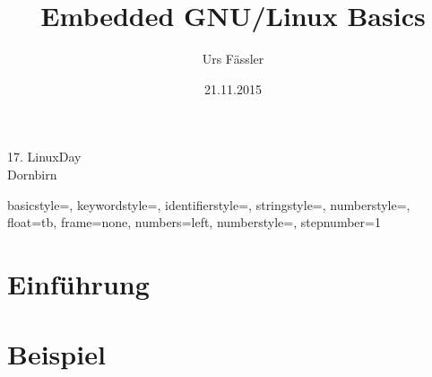 \usepackage[utf8x]{inputenc}
\usepackage{ucs}
\usepackage{amsmath}
\usepackage{amsfonts}
\usepackage{amssymb}
\usepackage{multicol}
\usepackage{graphicx}
\usepackage{tikz}
\usetikzlibrary{arrows,positioning,shapes,graphs}
\usepackage{listings}
\usepackage{multicol}
\usepackage[absolute,overlay]{textpos}
\usepackage{appendixnumberbeamer}
\usepackage{url}

\setlength{\TPHorizModule}{1cm}
\setlength{\TPVertModule}{1cm}

\title{Embedded GNU/Linux Basics}
\author{Urs Fässler}
\date{21.11.2015}
\institute
{
  17. LinuxDay\\
  Dornbirn
}

\newcommand{\hnote}[1]{\only<handout>{\footnote{#1}}}
\newcommand{\hcite}[1]{\only<handout>{\cite{#1}}}

\lstset
{  
	basicstyle=\scriptsize\ttfamily,
	keywordstyle={\bf\color{green!50!black}},
	identifierstyle=\color{blue!25!black},
	stringstyle=\color{orange!75!black},
  numberstyle={\color{Grey}},
	float=tb,
	frame=none,
	numbers=left,                           %
	numberstyle=\tiny,                      %
	stepnumber=1                           %
}


\newcommand*\oldmacro{}%
\let\oldmacro\insertshorttitle%
\renewcommand*\insertshorttitle{%
	\oldmacro\hfill%
	\insertframenumber
}

\beamertemplatenavigationsymbolsempty






\frame{\titlepage}

\section{Einführung}

\section{Beispiel}
